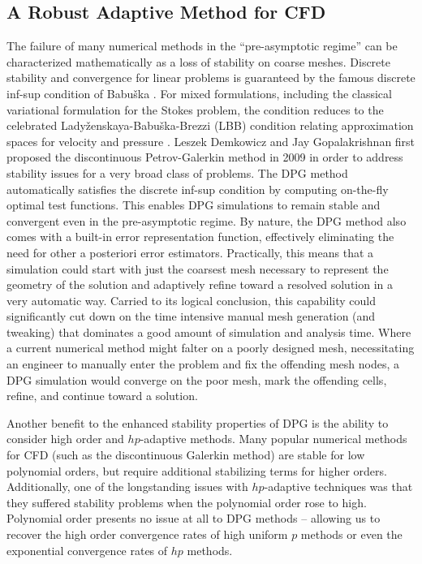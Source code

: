 \documentclass[Dissertation.tex]{subfiles}
\begin{document}
\subsection{A Robust Adaptive Method for CFD}
The failure of many numerical methods in the ``pre-asymptotic regime'' can be characterized mathematically as a loss of stability on coarse meshes.
Discrete stability and convergence for linear problems is guaranteed by the famous
discrete inf-sup condition of Babu\v{s}ka \cite{Babuska70}. For mixed formulations, including
the classical variational formulation for the Stokes problem, the condition
reduces to the celebrated Lady\v{z}enskaya-Babu\v{s}ka-Brezzi (LBB) condition
relating approximation spaces for velocity and pressure \cite{BabuskaBrezziReport}.
Leszek Demkowicz and Jay Gopalakrishnan first proposed the discontinuous Petrov-Galerkin method in 2009\cite{DPG1,DPG2} in order to address stability issues for a
very broad class of problems.
The DPG method automatically satisfies the discrete inf-sup condition by computing on-the-fly optimal test functions.
This enables DPG simulations to remain stable and convergent even in the pre-asymptotic regime.
By nature, the DPG method also comes with a built-in error representation function, effectively eliminating the need for other a posteriori error estimators.
Practically, this means that a simulation could start with just the coarsest mesh necessary to represent the geometry of the solution and adaptively refine toward a resolved solution in a very automatic way.
Carried to its logical conclusion, this capability could significantly cut down on the time intensive manual mesh generation (and tweaking) that dominates a good amount of simulation and analysis time.
Where a current numerical method might falter on a poorly designed mesh, necessitating an engineer to manually enter the problem and fix the offending mesh nodes, a DPG simulation would converge on the poor mesh, mark the offending cells, refine, and continue toward a solution.

Another benefit to the enhanced stability properties of DPG is the ability to consider high order and $hp$-adaptive methods.
Many popular numerical methods for CFD (such as the discontinuous Galerkin method) are stable for low polynomial orders, but require additional stabilizing terms for higher orders.
Additionally, one of the longstanding issues with $hp$-adaptive techniques was that they suffered stability problems when the polynomial order rose to high.
Polynomial order presents no issue at all to DPG methods -- allowing us to recover the high order convergence rates of high uniform $p$ methods or even the exponential convergence rates of $hp$ methods.
\end{document}
